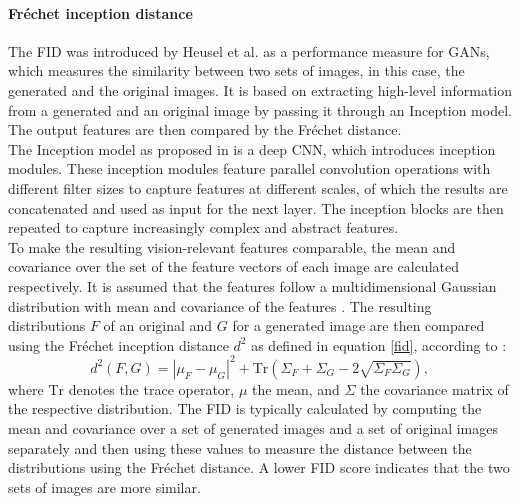 \paragraph{Fréchet inception distance}
The FID was introduced by Heusel et al. \cite{heusel2017gans} as a performance measure for GANs, which measures the similarity between two sets of images, in this case, the generated and the original images.
It is based on extracting high-level information from a generated and an original image by passing it through an Inception model.
The output features are then compared by the Fréchet distance.\\
The Inception model as proposed in \cite{szegedy2015going} is a deep CNN, which introduces inception modules.
These inception modules feature parallel convolution operations with different filter sizes to capture features at different scales, of which the results are concatenated and used as input for the next layer.
The inception blocks are then repeated to capture increasingly complex and abstract features.\\
To make the resulting vision-relevant features comparable, the mean and covariance over the set of the feature vectors of each image are calculated respectively.
It is assumed that the features follow a multidimensional Gaussian distribution with mean and covariance of the features \cite{heusel2017gans}.
The resulting distributions $F$ of an original and $G$ for a generated image are then compared using the Fréchet inception distance $d^2$ as defined in equation \ref{fid}, according to \cite{dowson1982frechet}:
\begin{equation}
    d^2(F,G) = |\mu_F - \mu_G|^2 + \text{Tr}(\Sigma_F + \Sigma_G - 2\sqrt{\Sigma_F \Sigma_G}),
    \label{fid}
\end{equation}
where $\text{Tr}$ denotes the trace operator, $\mu$ the mean, and $\Sigma$ the covariance matrix of the respective distribution.
The FID is typically calculated by computing the mean and covariance over a set of generated images and a set of original images separately and then using these values to measure the distance between the distributions using the Fréchet distance.
A lower FID score indicates that the two sets of images are more similar.

